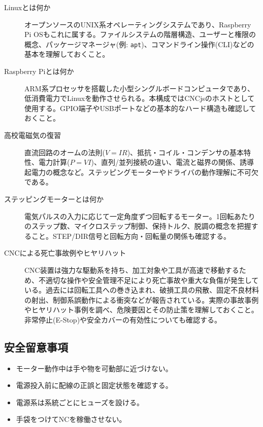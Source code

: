 \documentclass[uplatex,dvipdfmx]{ujarticle}
\begin{document}
\begin{description}
  \item[Linuxとは何か]  
    オープンソースのUNIX系オペレーティングシステムであり、Raspberry Pi OSもこれに属する。ファイルシステムの階層構造、ユーザーと権限の概念、パッケージマネージャ(例: \texttt{apt})、コマンドライン操作(CLI)などの基本を理解しておくこと。
  
  \item[Raspberry Piとは何か]  
    ARM系プロセッサを搭載した小型シングルボードコンピュータであり、低消費電力でLinuxを動作させられる。本構成ではCNCjsのホストとして使用する。GPIO端子やUSBポートなどの基本的なハード構造も確認しておくこと。

  \item[高校電磁気の復習]  
    直流回路のオームの法則($V=IR$)、抵抗・コイル・コンデンサの基本特性、電力計算($P=VI$)、直列/並列接続の違い、電流と磁界の関係、誘導起電力の概念など。ステッピングモーターやドライバの動作理解に不可欠である。

  \item[ステッピングモーターとは何か]  
    電気パルスの入力に応じて一定角度ずつ回転するモーター。1回転あたりのステップ数、マイクロステップ制御、保持トルク、脱調の概念を把握すること。STEP/DIR信号と回転方向・回転量の関係も確認する。
  
    \item[CNCによる死亡事故例やヒヤリハット]  
    CNC装置は強力な駆動系を持ち、加工対象や工具が高速で移動するため、不適切な操作や安全管理不足により死亡事故や重大な負傷が発生している。過去には回転工具への巻き込まれ、破損工具の飛散、固定不良材料の射出、制御系誤動作による衝突などが報告されている。実際の事故事例やヒヤリハット事例を調べ、危険要因とその防止策を理解しておくこと。非常停止(E-Stop)や安全カバーの有効性についても確認する。


\end{description}

\subsection{安全留意事項}
\begin{itemize}
    \item モーター動作中は手や物を可動部に近づけない。
    \item 電源投入前に配線の正誤と固定状態を確認する。
    \item 電源系は系統ごとにヒューズを設ける。
    \item 手袋をつけてNCを稼働させない｡
\end{itemize}
\end{document}
